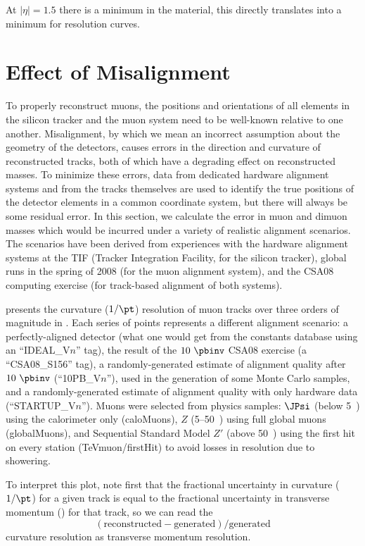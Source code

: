 At $|\eta| = 1.5$ there is a minimum in the material, this directly
translates into a minimum for resolution curves.


\section{Effect of Misalignment}\label{sec:misalignment}
To properly reconstruct muons, the positions and orientations of all
elements in the silicon tracker and the muon system need to be
well-known relative to one another.  Misalignment, by which we mean an
incorrect assumption about the geometry of the detectors, causes
errors in the direction and curvature of reconstructed tracks, both of
which have a degrading effect on reconstructed masses.  To minimize
these errors, data from dedicated hardware alignment systems and from
the tracks themselves are used to identify the true positions of the
detector elements in a common coordinate system, but there will always
be some residual error.  In this section, we calculate the error in
muon \pt and dimuon masses which would be incurred under a variety
of realistic alignment scenarios.  The scenarios have been derived
from experiences with the hardware alignment systems at the TIF
(Tracker Integration Facility, for the silicon tracker), global runs
in the spring of 2008 (for the muon alignment system), and the CSA08
computing exercise (for track-based alignment of both systems).

 presents the curvature
($1/\pt$) resolution of muon tracks over three orders of magnitude in
\pt.  Each series of points represents a different alignment
scenario: a perfectly-aligned detector (what one would get from the
constants database using an ``IDEAL\_V$n$'' tag), the result of the
$10~\pbinv$ CSA08 exercise (a ``CSA08\_S156'' tag), a
randomly-generated estimate of alignment quality after $10~\pbinv$
(``10PB\_V$n$''), used in the generation of some Monte Carlo samples,
and a randomly-generated estimate of alignment quality with only
hardware data (``STARTUP\_V$n$'').  Muons were selected from physics
samples: $\JPsi$ (below 5~\GeVc) using the calorimeter only (caloMuons),
$Z$ (5--50~\GeVc) using full global muons (globalMuons), and Sequential
Standard Model $Z'$ (above 50~\GeVc) using the first hit on every
station (TeVmuon/firstHit) to avoid losses in resolution due to
showering.

To interpret this plot, note first that the fractional uncertainty in
curvature ($1/\pt$) for a given track is equal to the fractional
uncertainty in transverse momentum (\pt) for that track, so we can
read the
\[(\mbox{reconstructed} - \mbox{generated}) / \mbox{generated} \]
curvature resolution as transverse momentum resolution.


